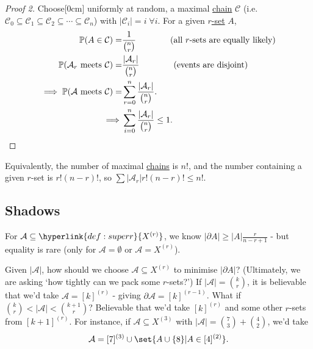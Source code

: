 \documentclass{article}
\let\subset\subseteq
\begin{document}
\begin{proof}[Proof 2]
  Choose[0cm] uniformly at random, a maximal \hyperlink{def:chain}{chain} $\mathcal{C}$ (i.e.\ $\mathcal{C}_0 \subset \mathcal{C}_1 \subset \mathcal{C}_2 \subset \dotsb \subset \mathcal{C}_n$) with $|\mathcal{C}_i| = i \; \forall i$.
  For a given \hyperlink{def:superr}{$r$-set} $A$,
 \begin{align*}\mathbb{P}(A \in \mathcal{C}) = &\frac{1}{\binom{n}{r}} \qquad \qquad \text{(all $r$-sets are equally likely)} \\
    \mathbb{P}(\mathcal{A}_r \text{ meets } \mathcal{C}) = &\frac{|\mathcal{A}_r|}{\binom{n}{r}} \qquad \qquad \text{(events are disjoint)} \\
    \implies \mathbb{P}(\mathcal{A} \text{ meets }\mathcal{C}) = &\sum_{r=0}^n \frac{|\mathcal{A}_r|}{\binom{n}{r}}. \\
    \implies &\sum_{i=0}^n \frac{|\mathcal{A}_r|}{\binom{n}{r}} \leq 1. \qedhere
  \end{align*}
\end{proof}
\begin{remark}
  Equivalently, the number of maximal \hyperlink{def:chain}{chains} is $n!$, and the number containing a given $r$-set is $r! (n-r)!$, so $\sum |\mathcal{A}_r| r! (n-r)! \leq n!$.
\end{remark}
\subsection{Shadows}
For $\mathcal{A} \subset \hyperlink{def:superr}{X^{(r)}}$, we know $|\partial A| \geq |A| \frac{r}{n-r+1}$ - but equality is rare (only for $\mathcal{A} = \emptyset$ or $\mathcal{A} = X^{(r)}$).

Given $|\mathcal{A}|$, how should we choose $\mathcal{A} \subset X^{(r)}$ to minimise $|\partial A|$?
(Ultimately, we are asking `how tightly can we pack some $r$-sets?')
If $|\mathcal{A}| = \binom{k}{r}$, it is believable that we'd take $\mathcal{A} = [k]^{(r)}$ - giving $\partial \mathcal{A} = [k]^{(r-1)}$.
What if $\binom{k}{r} < |\mathcal{A}| < \binom{k+1}{r}$? Believable that we'd take $[k]^{(r)}$ and some other $r$-sets from $[k+1]^{(r)}$.
For instance, if $\mathcal{A} \subset X^{(3)}$ with $|\mathcal{A}| = \binom{7}{3} + \binom{4}{2}$, we'd take
\begin{equation*}\mathcal{A} = [7]^{(3)} \cup \set{A \cup \{8\} | A\in [4]^{(2)}}.\end{equation*}
\end{document}
